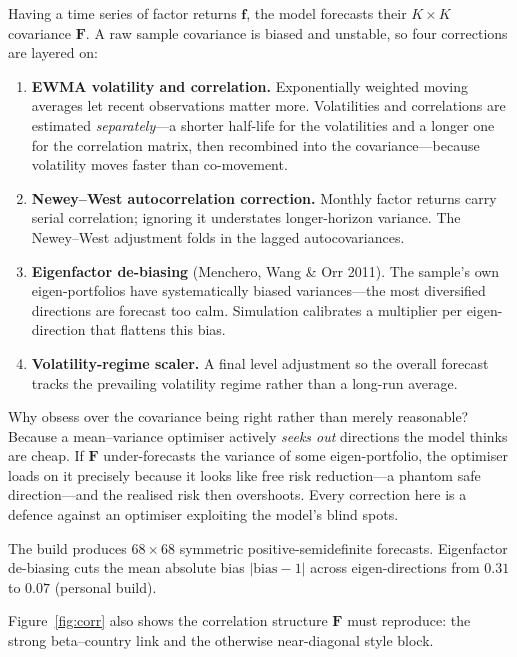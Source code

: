 \documentclass[11pt]{article}
\theoremstyle{definition}
\theoremstyle{plain}
\theoremstyle{remark}
\newcommand{\Fmat}{\mathbf{F}}
\newcommand{\fvec}{\mathbf{f}}
\begin{document}
Having a time series of factor returns $\fvec$, the model forecasts their $K\times K$ covariance $\Fmat$. A raw sample covariance is biased and unstable, so four corrections are layered on:
\begin{enumerate}[leftmargin=1.6em,nosep]
  \item \textbf{EWMA volatility and correlation.} Exponentially weighted moving averages let recent observations matter more. Volatilities and correlations are estimated \emph{separately}---a shorter half-life for the volatilities and a longer one for the correlation matrix, then recombined into the covariance---because volatility moves faster than co-movement.
  \item \textbf{Newey--West autocorrelation correction.} Monthly factor returns carry serial correlation; ignoring it understates longer-horizon variance. The Newey--West adjustment folds in the lagged autocovariances.
  \item \textbf{Eigenfactor de-biasing} (Menchero, Wang \& Orr 2011). The sample's own eigen-portfolios have systematically biased variances---the most diversified directions are forecast too calm. Simulation calibrates a multiplier per eigen-direction that flattens this bias.
  \item \textbf{Volatility-regime scaler.} A final level adjustment so the overall forecast tracks the prevailing volatility regime rather than a long-run average.
\end{enumerate}

\begin{intuition}
Why obsess over the covariance being right rather than merely reasonable? Because a mean--variance optimiser actively \emph{seeks out} directions the model thinks are cheap. If $\Fmat$ under-forecasts the variance of some eigen-portfolio, the optimiser loads on it precisely because it looks like free risk reduction---a phantom safe direction---and the realised risk then overshoots. Every correction here is a defence against an optimiser exploiting the model's blind spots.
\end{intuition}

\begin{observed}
The build produces $68\times 68$ symmetric positive-semidefinite forecasts. Eigenfactor de-biasing cuts the mean absolute bias $|{\text{bias}}-1|$ across eigen-directions from $0.31$ to $0.07$ (personal build).
\end{observed}

Figure~\ref{fig:corr} also shows the correlation structure $\Fmat$ must reproduce: the strong beta--country link and the otherwise near-diagonal style block.
\end{document}
